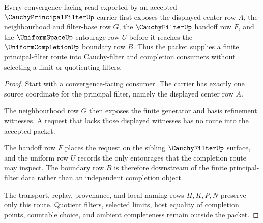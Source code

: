 \begin{theorem}
\label{thm:cauchy-principal-filter-convergence-handoff}
Every convergence-facing read exported by an accepted $\CauchyPrincipalFilterUp$ carrier first exposes the displayed center row $A$, the neighbourhood and filter-base row $G$, the $\CauchyFilterUp$ handoff row $F$, and the $\UniformSpaceUp$ entourage row $U$ before it reaches the $\UniformCompletionUp$ boundary row $B$. Thus the packet supplies a finite principal-filter route into Cauchy-filter and completion consumers without selecting a limit or quotienting filters.
\end{theorem}
\begin{proof}
Start with a convergence-facing consumer. The carrier has exactly one source coordinate for the principal filter, namely the displayed center row $A$.

The neighbourhood row $G$ then exposes the finite generator and basis refinement witnesses. A request that lacks those displayed witnesses has no route into the accepted packet.

The handoff row $F$ places the request on the sibling $\CauchyFilterUp$ surface, and the uniform row $U$ records the only entourages that the completion route may inspect. The boundary row $B$ is therefore downstream of the finite principal-filter data rather than an independent completion object.

The transport, replay, provenance, and local naming rows $H,K,P,N$ preserve only this route. Quotient filters, selected limits, host equality of completion points, countable choice, and ambient completeness remain outside the packet.
\end{proof}


\begin{closurestatus}{\CauchyPrincipalFilterUp}
  \theoryclosure{\seedClosure}
  \formalstatus{\unformalizedV}
\end{closurestatus}
